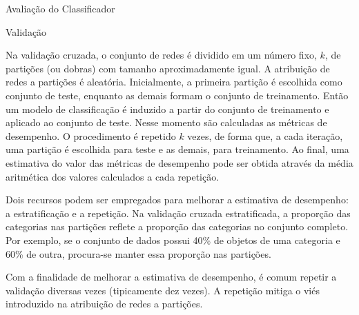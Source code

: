 \begin{section}{Avaliação do Classificador}
\begin{subsection}{Validação}

		Na validação cruzada, o conjunto de redes é dividido em um número fixo, $k$, de partições (ou dobras) com tamanho aproximadamente igual. A atribuição de redes a partições é aleatória. Inicialmente, a primeira partição é escolhida como conjunto de teste, enquanto as demais formam o conjunto de treinamento. Então um modelo de classificação é induzido a partir do conjunto de treinamento e aplicado ao conjunto de teste. Nesse momento são calculadas as métricas de desempenho. O procedimento é repetido $k$ vezes, de forma que, a cada iteração, uma partição é escolhida para teste e as demais, para treinamento. Ao final, uma estimativa do valor das métricas de desempenho pode ser obtida através da média aritmética dos valores calculados a cada repetição.

		Dois recursos podem ser empregados para melhorar a estimativa de desempenho: a estratificação e a repetição. Na validação cruzada estratificada, a proporção das categorias nas partições reflete a proporção das categorias no conjunto completo. Por exemplo, se o conjunto de dados possui 40\% de objetos de uma categoria e 60\% de outra, procura-se manter essa proporção nas partições. 

		Com a finalidade de melhorar a estimativa de desempenho, é comum repetir a validação diversas vezes (tipicamente dez vezes). A repetição mitiga o viés introduzido na atribuição de redes a partições.


\end{subsection}
\end{section}
